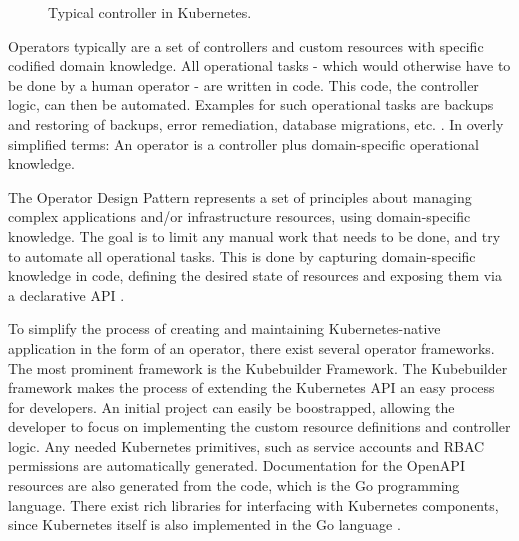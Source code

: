\begin{figure}[h]
	\centering
	\caption{Typical controller in Kubernetes.
	}
	\label{fig:typicalControllerKubernetes}	
\end{figure}

Operators typically are a set of controllers and custom resources
with specific codified domain knowledge.
All operational tasks -
which would otherwise have to be done by a human operator -
are written in code.
This code, the controller logic, can then be automated.
Examples for such operational tasks are
backups and restoring of backups, error remediation, database migrations, etc.
\autocite{operatorWhitepaperV1}.
In overly simplified terms:
An operator is a controller plus domain-specific operational knowledge.
\autocite{operatorWhitepaperV1}


The Operator Design Pattern represents a set of principles about
managing complex applications and/or infrastructure resources,
using domain-specific knowledge.
The goal is to limit any manual work that needs to be done,
and try to automate all operational tasks.
This is done by capturing domain-specific knowledge in code,
defining the desired state of resources and exposing them
via a declarative API
\autocite{operatorWhitepaperV1}.

To simplify the process of creating and maintaining Kubernetes-native application
in the form of an operator,
there exist several operator frameworks.
The most prominent framework is the Kubebuilder Framework.
The Kubebuilder framework makes the process of extending the Kubernetes API
an easy process for developers.
An initial project can easily be boostrapped, allowing the developer to focus
on implementing the custom resource definitions and controller logic.
Any needed Kubernetes primitives, such as service accounts and RBAC permissions
are automatically generated.
Documentation for the OpenAPI resources are also generated from the code,
which is the Go programming language.
There exist rich libraries for interfacing with Kubernetes components,
since Kubernetes itself is also implemented in the Go language
\autocite{kubebuilderBookWebsite}.

